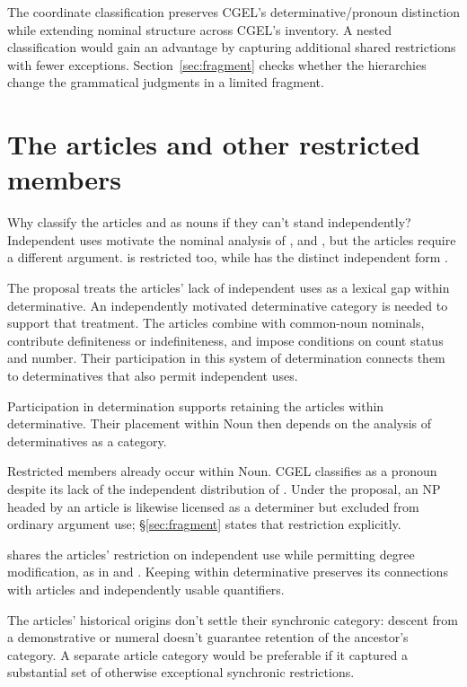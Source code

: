 \documentclass[12pt]{article}
\begin{document}
The coordinate classification preserves CGEL's determinative/pronoun distinction while extending nominal structure across CGEL's inventory. A nested classification would gain an advantage by capturing additional shared restrictions with fewer exceptions. Section~\ref{sec:fragment} checks whether the hierarchies change the grammatical judgments in a limited fragment.

\section{The articles and other restricted members}\label{sec:articles}

Why classify the articles  and  as nouns if they can't stand independently? Independent uses motivate the nominal analysis of ,  and , but the articles require a different argument.  is restricted too, while  has the distinct independent form  \citep[371--372, 410--411]{huddleston2002}.

The proposal treats the articles' lack of independent uses as a lexical gap within determinative. An independently motivated determinative category is needed to support that treatment. The articles combine with common-noun nominals, contribute definiteness or indefiniteness, and impose conditions on count status and number. Their participation in this system of determination connects them to determinatives that also permit independent uses.

Participation in determination supports retaining the articles within determinative. Their placement within Noun then depends on the analysis of determinatives as a category.

Restricted members already occur within Noun. CGEL classifies  as a pronoun despite its lack of the independent distribution of  \citep[470--471]{huddleston2002}. Under the proposal, an NP headed by an article is likewise licensed as a determiner but excluded from ordinary argument use; §\ref{sec:fragment} states that restriction explicitly.

 shares the articles' restriction on independent use while permitting degree modification, as in  and . Keeping  within determinative preserves its connections with articles and independently usable quantifiers.

The articles' historical origins don't settle their synchronic category: descent from a demonstrative or numeral doesn't guarantee retention of the ancestor's category. A separate article category would be preferable if it captured a substantial set of otherwise exceptional synchronic restrictions.
\end{document}
